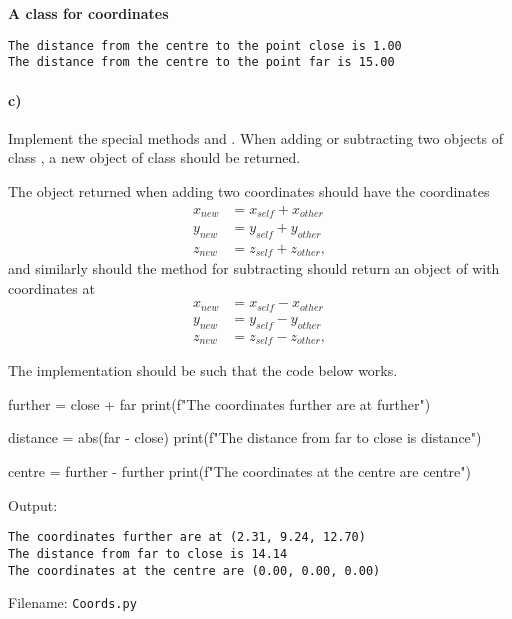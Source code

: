 \begin{Problem} {\textbf{A class for coordinates}}
\begin{lstlisting}
The distance from the centre to the point close is 1.00
The distance from the centre to the point far is 15.00
\end{lstlisting}


\paragraph{c)} Implement the special methods  and \newline  {}. When adding or subtracting two objects of class , a new object of class  should be returned.

The object returned when adding two coordinates should have the coordinates
\begin{equation*}
\begin{split}
    x_{new} &= x_{self} + x_{other} \\
    y_{new} &= y_{self} + y_{other} \\
    z_{new} &= z_{self} + z_{other} ,
\end{split}
\end{equation*}
and similarly should the method for subtracting should return an object of  with coordinates at
\begin{equation*}
\begin{split}
    x_{new} &= x_{self} - x_{other} \\
    y_{new} &= y_{self} - y_{other} \\
    z_{new} &= z_{self} - z_{other} ,
\end{split}
\end{equation*}

The implementation should be such that the code below works.
\begin{python}
further = close + far
print(f"The coordinates further are at {further}")

distance = abs(far - close)
print(f"The distance from far to close is {distance}")

centre = further - further
print(f"The coordinates at the centre are {centre}")
\end{python}
Output:
\begin{lstlisting}
The coordinates further are at (2.31, 9.24, 12.70)
The distance from far to close is 14.14
The coordinates at the centre are (0.00, 0.00, 0.00)
\end{lstlisting}


Filename: \texttt{Coords.py}
\end{Problem}
